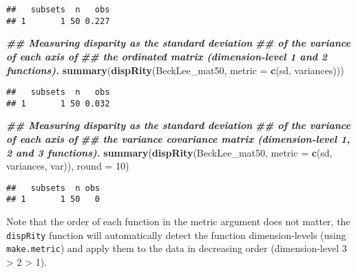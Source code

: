 \documentclass[
]{book}
\newenvironment{Shaded}{\begin{snugshade}}{\end{snugshade}}
\newcommand{\AttributeTok}[1]{\textcolor[rgb]{0.13,0.29,0.53}{#1}}
\newcommand{\DecValTok}[1]{\textcolor[rgb]{0.00,0.00,0.81}{#1}}
\newcommand{\DocumentationTok}[1]{\textcolor[rgb]{0.56,0.35,0.01}{\textbf{\textit{#1}}}}
\newcommand{\FunctionTok}[1]{\textcolor[rgb]{0.13,0.29,0.53}{\textbf{#1}}}
\newcommand{\NormalTok}[1]{#1}
\begin{document}
\begin{verbatim}
##   subsets  n   obs
## 1       1 50 0.227
\end{verbatim}

\begin{Shaded}
\begin{Highlighting}[]
\DocumentationTok{\#\# Measuring disparity as the standard deviation}
\DocumentationTok{\#\# of the variance of each axis of}
\DocumentationTok{\#\# the ordinated matrix (dimension{-}level 1 and 2 functions).}
\FunctionTok{summary}\NormalTok{(}\FunctionTok{dispRity}\NormalTok{(BeckLee\_mat50, }\AttributeTok{metric =} \FunctionTok{c}\NormalTok{(sd, variances)))}
\end{Highlighting}
\end{Shaded}

\begin{verbatim}
##   subsets  n   obs
## 1       1 50 0.032
\end{verbatim}

\begin{Shaded}
\begin{Highlighting}[]
\DocumentationTok{\#\# Measuring disparity as the standard deviation}
\DocumentationTok{\#\# of the variance of each axis of}
\DocumentationTok{\#\# the variance covariance matrix (dimension{-}level 1, 2 and 3 functions).}
\FunctionTok{summary}\NormalTok{(}\FunctionTok{dispRity}\NormalTok{(BeckLee\_mat50, }\AttributeTok{metric =} \FunctionTok{c}\NormalTok{(sd, variances, var)), }\AttributeTok{round =} \DecValTok{10}\NormalTok{)}
\end{Highlighting}
\end{Shaded}

\begin{verbatim}
##   subsets  n obs
## 1       1 50   0
\end{verbatim}

Note that the order of each function in the metric argument does not matter, the \texttt{dispRity} function will automatically detect the function dimension-levels (using \texttt{make.metric}) and apply them to the data in decreasing order (dimension-level 3 \textgreater{} 2 \textgreater{} 1).
\end{document}
